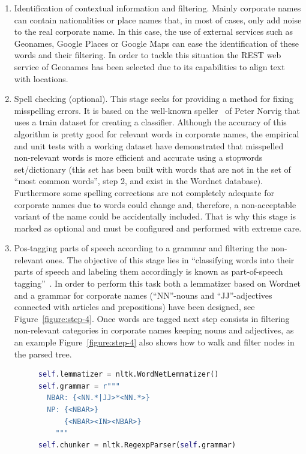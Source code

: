 \documentclass{llncs}
\begin{document}
\begin{enumerate}
\item Identification of contextual information and filtering. Mainly corporate names can contain nationalities or place names that, in most of 
cases, only add noise to the real corporate name. In this case, the use of external services such as Geonames, Google Places 
or Google Maps can ease the identification of these words and their filtering. In order to tackle this situation the REST web service 
of Geonames has been selected due to its capabilities to align text with locations.

\item Spell checking (optional). This stage seeks for providing a method for fixing misspelling errors. It is based on the 
well-known speller~\cite{NorvigSpelling} of Peter Norvig that uses a train dataset for creating a classifier. Although the accuracy of this 
algorithm is pretty good for relevant words in corporate names, the empirical and unit tests with a working dataset 
have demonstrated that misspelled non-relevant words is more efficient and accurate using a stopwords set/dictionary (this set has been 
built with words that are not in the set of ``most common words'', step 2, and exist in the Wordnet database). Furthermore some spelling corrections 
are not completely adequate for corporate names due to words could change and, therefore, a non-acceptable variant of the name 
could be accidentally included. That is why this stage is marked as optional and must be configured and performed with extreme care.

\item Pos-tagging parts of speech according to a grammar and filtering the non-relevant ones. The objective 
of this stage lies in ``classifying words into their parts of speech and labeling them accordingly is known as part-of-speech tagging''~\cite{LoperBird02}. In order 
to perform this task both a lemmatizer based on Wordnet and a grammar for corporate names (``NN''-nouns and ``JJ''-adjectives connected with articles and 
prepositions) have been designed, see Figure~\ref{figure:step-4}. Once words are tagged next step consists in filtering non-relevant categories 
in corporate names keeping nouns and adjectives, as an example Figure~\ref{figure:step-4} also shows how to walk and filter nodes in the parsed tree.

\begin{figure}[!h]
\begin{center}
\begin{lstlisting}[language=Python]  
self.lemmatizer = nltk.WordNetLemmatizer()
self.grammar = r"""
  NBAR: {<NN.*|JJ>*<NN.*>}   
  NP: {<NBAR>}
      {<NBAR><IN><NBAR>} 
    """
self.chunker = nltk.RegexpParser(self.grammar)


\end{lstlisting}
\end{center}
\end{figure}
\end{enumerate}
\end{document}

